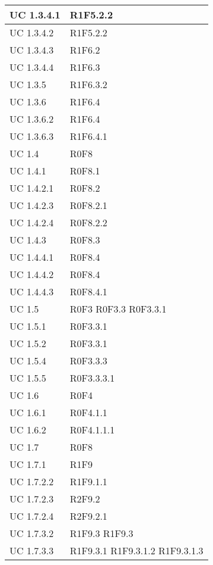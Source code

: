 \begin{center}
\begin{longtable}{| p{4cm} | p{4cm} |}
		\hline
		UC 1.3.4.1  &  R1F5.2.2 \\
		\hline
		UC 1.3.4.2  &  R1F5.2.2 \\
		\hline
		UC 1.3.4.3  &  R1F6.2 \\
		\hline
		UC 1.3.4.4  &  R1F6.3 \\
		\hline
		UC 1.3.5  &  R1F6.3.2 \\
		\hline
		UC 1.3.6  &  R1F6.4 \\
		\hline
		UC 1.3.6.2  &  R1F6.4 \\
		\hline
		UC 1.3.6.3  &  R1F6.4.1 \\
		\hline
		UC 1.4  &  R0F8 \\
		\hline
		UC 1.4.1  &  R0F8.1 \\
		\hline
		UC 1.4.2.1  &  R0F8.2 \\
		\hline
		UC 1.4.2.3  &  R0F8.2.1 \\
		\hline
		UC 1.4.2.4  &  R0F8.2.2 \\
		\hline
		UC 1.4.3  &  R0F8.3 \\
		\hline
		UC 1.4.4.1  &  R0F8.4 \\
		\hline
		UC 1.4.4.2  &  R0F8.4 \\
		\hline
		UC 1.4.4.3  &  R0F8.4.1 \\
		\hline
		UC 1.5  &  R0F3 \newline R0F3.3 \newline R0F3.3.1 \\
		\hline
		UC 1.5.1  &  R0F3.3.1 \\
		\hline
		UC 1.5.2  &  R0F3.3.1 \\
		\hline
		UC 1.5.4  &  R0F3.3.3 \\
		\hline
		UC 1.5.5  &  R0F3.3.3.1 \\
		\hline
		UC 1.6  &  R0F4 \\
		\hline
		UC 1.6.1  &  R0F4.1.1 \\
		\hline
		UC 1.6.2  &  R0F4.1.1.1 \\
		\hline
		UC 1.7  &  R0F8 \\
		\hline
		UC 1.7.1  &  R1F9 \\
		\hline
		UC 1.7.2.2  &  R1F9.1.1 \\
		\hline
		UC 1.7.2.3  &  R2F9.2 \\
		\hline
		UC 1.7.2.4  &  R2F9.2.1 \\
		\hline
		UC 1.7.3.2  &  R1F9.3 \newline R1F9.3 \\
		\hline
		UC 1.7.3.3  &  R1F9.3.1 \newline R1F9.3.1.2 \newline R1F9.3.1.3 \\

\end{longtable}
\end{center}
